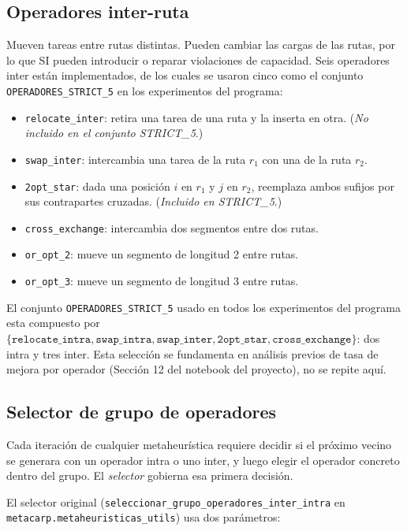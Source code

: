 \subsection{Operadores inter-ruta}

Mueven tareas entre rutas distintas. Pueden cambiar las cargas de las
rutas, por lo que SI pueden introducir o reparar violaciones de
capacidad. Seis operadores inter están implementados, de los cuales se
usaron cinco como el conjunto \texttt{OPERADORES\_STRICT\_5} en los
experimentos del programa:

\begin{itemize}
\item \texttt{relocate\_inter}: retira una tarea de una ruta y la
  inserta en otra. (\emph{No incluido en el conjunto STRICT\_5}.)
\item \texttt{swap\_inter}: intercambia una tarea de la ruta $r_1$ con
  una de la ruta $r_2$.
\item \texttt{2opt\_star}: dada una posición $i$ en $r_1$ y $j$ en $r_2$,
  reemplaza ambos sufijos por sus contrapartes cruzadas. (\emph{Incluido en STRICT\_5}.)
\item \texttt{cross\_exchange}: intercambia dos segmentos entre dos rutas.
\item \texttt{or\_opt\_2}: mueve un segmento de longitud 2 entre rutas.
\item \texttt{or\_opt\_3}: mueve un segmento de longitud 3 entre rutas.
\end{itemize}

El conjunto \texttt{OPERADORES\_STRICT\_5} usado en todos los
experimentos del programa esta compuesto por
$\{\texttt{relocate\_intra}, \texttt{swap\_intra},
\texttt{swap\_inter}, \texttt{2opt\_star}, \texttt{cross\_exchange}\}$:
dos intra y tres inter. Esta selección se fundamenta en análisis
previos de tasa de mejora por operador (Sección 12 del notebook del
proyecto), no se repite aquí.

\subsection{Selector de grupo de operadores}
\label{sec:selector}

Cada iteración de cualquier metaheurística requiere decidir si el
próximo vecino se generara con un operador intra o uno inter, y luego
elegir el operador concreto dentro del grupo. El \emph{selector}
gobierna esa primera decisión.

El selector original (\texttt{seleccionar\_grupo\_operadores\_inter\_intra}
en \texttt{metacarp.metaheuristicas\_utils}) usa dos parámetros:

